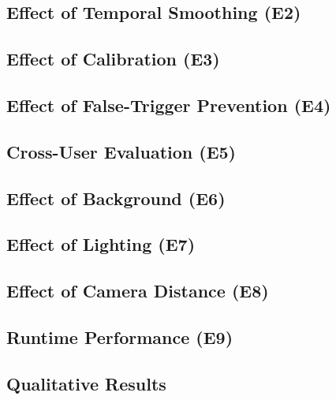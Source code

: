 \subsection{Effect of Temporal Smoothing (E2)}
\subsection{Effect of Calibration (E3)}
\subsection{Effect of False-Trigger Prevention (E4)}
\subsection{Cross-User Evaluation (E5)}
\subsection{Effect of Background (E6)}
\subsection{Effect of Lighting (E7)}
\subsection{Effect of Camera Distance (E8)}
\subsection{Runtime Performance (E9)}
\subsection{Qualitative Results}
\else
